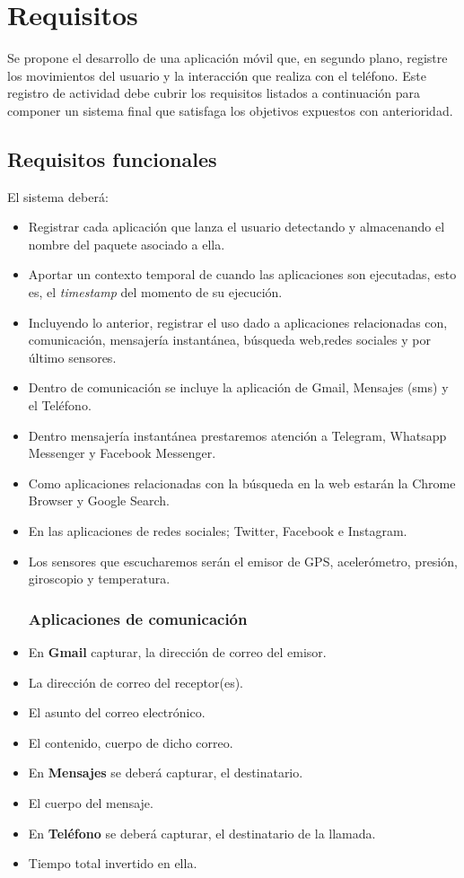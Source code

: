 \documentclass[12pt,a4paper,oneside]{book} %
\begin{document}
\section{Requisitos}
Se propone el desarrollo de una aplicación móvil que, en segundo plano, registre los movimientos del usuario y la interacción que realiza con el teléfono. Este registro de actividad debe cubrir los requisitos listados a continuación para componer un sistema final que satisfaga los objetivos expuestos con anterioridad. 
\subsection{Requisitos funcionales}
El sistema deberá: 
\begin{itemize}
  \item Registrar cada aplicación que lanza el usuario detectando y almacenando el nombre del paquete asociado a ella. 
  \item Aportar un contexto temporal de cuando las aplicaciones son ejecutadas, esto es, el \textit{timestamp} del momento de su ejecución. 
  \item Incluyendo lo anterior, registrar el uso dado a aplicaciones relacionadas con, comunicación, mensajería instantánea, búsqueda web,redes sociales y por último sensores. 
  \item Dentro de comunicación se incluye la aplicación de Gmail, Mensajes (sms) y el Teléfono. 
  \item Dentro mensajería instantánea prestaremos atención a Telegram, Whatsapp Messenger y Facebook Messenger. 
  \item Como aplicaciones relacionadas con la búsqueda en la web estarán la Chrome Browser y Google Search. 
  \item En las aplicaciones de redes sociales; Twitter, Facebook e Instagram.
  \item Los sensores que escucharemos serán el emisor de GPS, acelerómetro, presión, giroscopio y temperatura.
\subsubsection{Aplicaciones de comunicación}
  \item En  \textbf{Gmail} capturar, la dirección de correo del emisor. 
  \item La dirección de correo del receptor(es). 
  \item El asunto del correo electrónico. 
  \item El contenido, cuerpo de dicho correo. 
  \item En \textbf{Mensajes} se deberá capturar, el destinatario. 
  \item El cuerpo del mensaje. 
  \item En \textbf{Teléfono} se deberá capturar, el destinatario de la llamada. 
  \item Tiempo total invertido en ella. 

\end{itemize}
\end{document}
